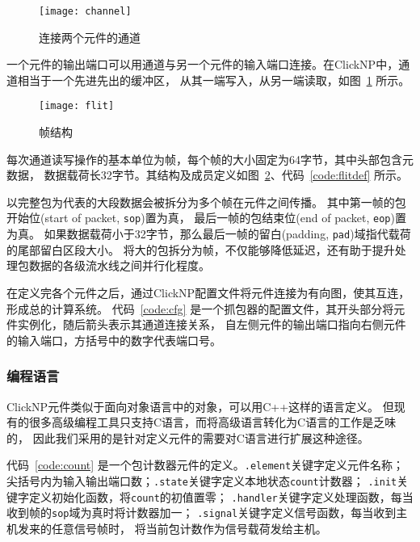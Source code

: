 \begin{figure}[htbp]
\centering
\texttt{[image: channel]}
\caption{连接两个元件的通道} \label{fig:channel}
\end{figure}

一个元件的输出端口可以用通道与另一个元件的输入端口连接。在ClickNP中，通道相当于一个先进先出的缓冲区，
从其一端写入，从另一端读取，如图~\ref{fig:channel} 所示。

\begin{figure}[htbp]
\centering
\texttt{[image: flit]}
\caption{帧结构} \label{fig:flit}
\end{figure}



每次通道读写操作的基本单位为帧，每个帧的大小固定为64字节，其中头部包含元数据，
数据载荷长32字节。其结构及成员定义如图~\ref{fig:flit}、代码~\ref{code:flitdef} 所示。

以完整包为代表的大段数据会被拆分为多个帧在元件之间传播。
其中第一帧的包开始位(start of packet, \lstinline$sop$)置为真，
最后一帧的包结束位(end of packet, \lstinline$eop$)置为真。
如果数据载荷小于32字节，那么最后一帧的留白(padding, \lstinline$pad$)域指代载荷的尾部留白区段大小。
将大的包拆分为帧，不仅能够降低延迟，还有助于提升处理包数据的各级流水线之间并行化程度。

在定义完各个元件之后，通过ClickNP配置文件将元件连接为有向图，使其互连，形成总的计算系统。
代码~\ref{code:cfg} 是一个抓包器的配置文件，其开头部分将元件实例化，随后箭头表示其通道连接关系，
自左侧元件的输出端口指向右侧元件的输入端口，方括号中的数字代表端口号。
\begin{figure}[htbp]
\centering

\end{figure}

\subsubsection{编程语言}
ClickNP元件类似于面向对象语言中的对象，可以用C++这样的语言定义。
但现有的很多高级编程工具只支持C语言，而将高级语言转化为C语言的工作是乏味的，
因此我们采用的是针对定义元件的需要对C语言进行扩展这种途径。


代码~\ref{code:count} 是一个包计数器元件的定义。\lstinline$.element$关键字定义元件名称；
尖括号内为输入输出端口数；\lstinline$.state$关键字定义本地状态\lstinline$count$计数器；
\lstinline$.init$关键字定义初始化函数，将\lstinline$count$的初值置零；
\lstinline$.handler$关键字定义处理函数，每当收到帧的\lstinline$sop$域为真时将计数器加一；
\lstinline$.signal$关键字定义信号函数，每当收到主机发来的任意信号帧时，
将当前包计数作为信号载荷发给主机。

